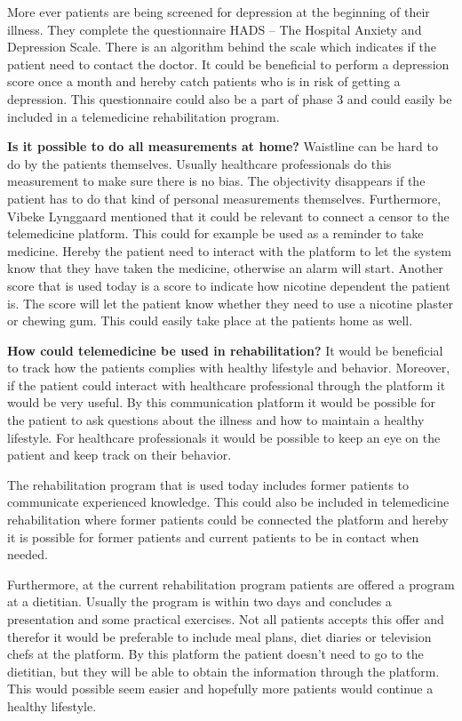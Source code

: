 More ever patients are being screened for depression at the beginning of their illness. They complete the questionnaire HADS – The Hospital Anxiety and Depression Scale. There is an algorithm behind the scale which indicates if the patient need to contact the doctor. It could be beneficial to perform a depression score once a month and hereby catch patients who is in risk of getting a depression. This questionnaire could also be a part of phase 3 and could easily be included in a telemedicine rehabilitation program. 

\textbf{Is it possible to do all measurements at home?} \newline 
Waistline can be hard to do by the patients themselves. Usually healthcare professionals do this measurement to make sure there is no bias. The objectivity disappears if the patient has to do that kind of personal measurements themselves. Furthermore, Vibeke Lynggaard mentioned that it could be relevant to connect a censor to the telemedicine platform. This could for example be used as a reminder to take medicine. Hereby the patient need to interact with the platform to let the system know that they have taken the medicine, otherwise an alarm will start. Another score that is used today is a score to indicate how nicotine dependent the patient is. The score will let the patient know whether they need to use a nicotine plaster or chewing gum. This could easily take place at the patients home as well. 

\textbf{How could telemedicine be used in rehabilitation?} \newline 
It would be beneficial to track how the patients complies with healthy lifestyle and behavior. Moreover, if the patient could interact with healthcare professional through the platform it would be very useful. By this communication platform it would be possible for the patient to ask questions about the illness and how to maintain a healthy lifestyle. For healthcare professionals it would be possible to keep an eye on the patient and keep track on their behavior. 

The rehabilitation program that is used today includes former patients to communicate experienced knowledge. This could also be included in telemedicine rehabilitation where former patients could be connected the platform and hereby it is possible for former patients and current patients to be in contact when needed.   

Furthermore, at the current rehabilitation program patients are offered a program at a dietitian. Usually the program is within two days and concludes a presentation and some practical exercises. Not all patients accepts this offer and therefor it would be preferable to include meal plans, diet diaries or television chefs at the platform. By this platform the patient doesn’t need to go to the dietitian, but they will be able to obtain the information through the platform. This would possible seem easier and hopefully more patients would continue a healthy lifestyle. 

